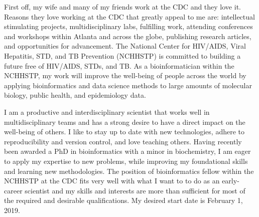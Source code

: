 \documentclass[11pt, letterpaper]{CV_latex_class}
\begin{document}
\begin{cvletter}

\hspace{1em} First off, my wife and many of my friends work at the CDC and they love it. Reasons they love working at the CDC that greatly appeal to me are: intellectual stimulating projects, multidisciplinary labs, fulfilling work, attending conferences and workshops within Atlanta and across the globe, publishing research articles, and opportunities for advancement. The National Center for HIV/AIDS, Viral Hepatitis, STD, and TB Prevention (NCHHSTP) is committed to building a future free of HIV/AIDS, STDs, and TB. As a bioinformatician within the NCHHSTP, my work will improve the well-being of people across the world by applying bioinformatics and data science methods to large amounts of molecular biology, public health, and epidemiology data.


\hspace{1em} I am a productive and interdisciplinary scientist that works well in multidisciplinary teams and has a strong desire to have a direct impact on the well-being of others. I like to stay up to date with new technologies, adhere to reproducibility and version control, and love teaching others. Having recently been awarded a PhD in bioinformatics with a minor in biochemistry, I am eager to apply my expertise to new problems, while improving my foundational skills and learning new methodologies. The position of bioinformatics fellow within the NCHHSTP at the CDC fits very well with what I want to to do as an early-career scientist and my skills and interests are more than sufficient for most of the required and desirable qualifications. My desired start date is February 1, 2019.

\end{cvletter}


\makeletterclosing

\end{document}
